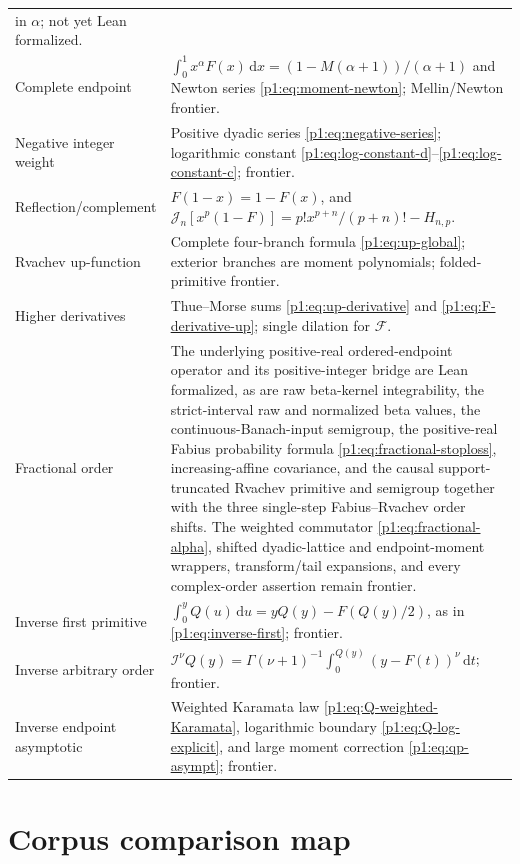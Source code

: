 \documentclass[11pt,oneside]{article}
\theoremstyle{definition}
\theoremstyle{remark}
\newcommand{\Fs}{\mathcal F}
\newcommand{\dd}{\,\mathrm d}
\newcommand{\Jn}{\mathcal J}
\newcommand{\RL}{\mathcal I}
\newcommand{\1}{\mathbf 1}
\begin{document}
\begin{longtable}{@{}p{}p{}@{}}
in \(\alpha\); not yet Lean formalized.\\[1mm]
Complete endpoint&
\(\int_0^1x^\alpha F(x)\dd x=(1-M(\alpha+1))/(\alpha+1)\) and
Newton series \eqref{p1:eq:moment-newton}; Mellin/Newton frontier.\\[1mm]
Negative integer weight&
Positive dyadic series \eqref{p1:eq:negative-series}; logarithmic constant
\eqref{p1:eq:log-constant-d}--\eqref{p1:eq:log-constant-c}; frontier.\\[1mm]
Reflection/complement&
\(F(1-x)=1-F(x)\), and
\(\Jn_n[x^p(1-F)]=p!x^{p+n}/(p+n)!-H_{n,p}\).\\[1mm]
Rvachev up-function&
Complete four-branch formula \eqref{p1:eq:up-global}; exterior branches are
moment polynomials; folded-primitive frontier.\\[1mm]
Higher derivatives&
Thue--Morse sums \eqref{p1:eq:up-derivative} and
\eqref{p1:eq:F-derivative-up}; single dilation for \(\Fs\).\\[1mm]
Fractional order&
The underlying positive-real ordered-endpoint operator and its positive-integer bridge are
Lean formalized, as are raw beta-kernel integrability, the strict-interval raw and
normalized beta values, the continuous-Banach-input semigroup, the positive-real Fabius
probability formula \eqref{p1:eq:fractional-stoploss}, increasing-affine covariance, and the
causal support-truncated Rvachev primitive and semigroup together with the three single-step
Fabius--Rvachev order shifts.  The weighted commutator
\eqref{p1:eq:fractional-alpha}, shifted dyadic-lattice and endpoint-moment wrappers,
transform/tail expansions, and every complex-order assertion remain frontier.\\[1mm]
Inverse first primitive&
\(\int_0^yQ(u)\dd u=yQ(y)-F(Q(y)/2)\), as in
\eqref{p1:eq:inverse-first}; frontier.\\[1mm]
Inverse arbitrary order&
\(\RL^\nu Q(y)=\Gamma(\nu+1)^{-1}\int_0^{Q(y)}(y-F(t))^\nu\dd t\);
frontier.\\[1mm]
Inverse endpoint asymptotic&
Weighted Karamata law \eqref{p1:eq:Q-weighted-Karamata}, logarithmic boundary
\eqref{p1:eq:Q-log-explicit}, and large moment correction \eqref{p1:eq:qp-asympt};
frontier.\\
\bottomrule
\end{longtable}

\appendix

\section{Corpus comparison map}
\end{document}
